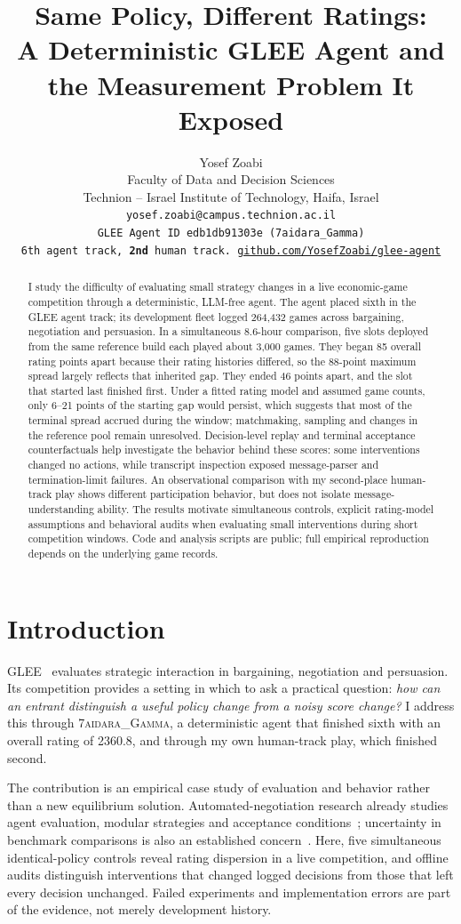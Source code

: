 \documentclass{article}
\title{Same Policy, Different Ratings:\\
       A Deterministic GLEE Agent and\\
       the Measurement Problem It Exposed}
\author{%
  Yosef Zoabi\\
  Faculty of Data and Decision Sciences\\
  Technion -- Israel Institute of Technology, Haifa, Israel\\
  \texttt{yosef.zoabi@campus.technion.ac.il}\\
  \texttt{\small GLEE Agent ID \texttt{edb1db91303e} (7aidara\_Gamma)}\\
  \texttt{\small 6th agent track, \textbf{2nd} human track. \href{https://github.com/YosefZoabi/glee-agent}{github.com/YosefZoabi/glee-agent}}
}
\begin{document}
\maketitle

\begin{abstract}
I study the difficulty of evaluating small strategy changes in a live economic-game
competition through a deterministic, LLM-free agent. The agent placed sixth in the
GLEE agent track; its development fleet logged 264,432 games across bargaining,
negotiation and persuasion. In a simultaneous 8.6-hour comparison, five slots
deployed from the same reference build each played about 3,000 games. They began 85 overall
rating points apart because their rating histories differed, so the 88-point
maximum spread largely reflects that inherited gap. They ended 46 points apart,
and the slot that started last finished first. Under a fitted rating model and
assumed game counts, only 6--21 points of the starting gap would persist, which
suggests that most of the terminal spread accrued during the window; matchmaking,
sampling and changes in the reference pool remain unresolved. Decision-level
replay and terminal acceptance counterfactuals help investigate the behavior behind
these scores: some interventions changed no actions, while transcript inspection
exposed message-parser and termination-limit failures. An observational comparison
with my second-place human-track play shows different participation behavior, but
does not isolate message-understanding ability. The results motivate simultaneous
controls, explicit rating-model assumptions and behavioral audits when evaluating
small interventions during short competition windows. Code and analysis scripts
are public; full empirical reproduction depends on the underlying game records.
\end{abstract}

\section{Introduction}
GLEE~\cite{shapira2024glee} evaluates strategic interaction in bargaining,
negotiation and persuasion. Its competition provides a setting in which to ask a
practical question: \emph{how can an entrant distinguish a useful policy change
from a noisy score change?} I address this through \textsc{7aidara\_Gamma}, a
deterministic agent that finished sixth with an overall rating of 2360.8, and
through my own human-track play, which finished second.

The contribution is an empirical case study of evaluation and behavior rather
than a new equilibrium solution. Automated-negotiation research already studies
agent evaluation, modular strategies and acceptance conditions~\cite{anac2011,baarslag2014decoupling,baarslag2013acceptance};
uncertainty in benchmark comparisons is also an established concern~\cite{agarwal2021}.
Here, five simultaneous identical-policy controls reveal rating dispersion in a
live competition, and offline audits distinguish interventions that changed
logged decisions from those that left every decision unchanged. Failed experiments and implementation errors are
part of the evidence, not merely development history.
\end{document}
